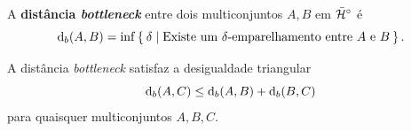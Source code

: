 \begin{defi}
    A \textbf{distância \textit{bottleneck}} entre dois multiconjuntos $A,B$ em $\bar{\mathcal{H}}^\circ$ é
    \begin{equation*}
        \text{d}_b(A,B) = \inf \Set{\delta | \text{Existe um } \delta \text{-emparelhamento entre 
        } A \text{ e } B}.
    \end{equation*}
\end{defi}

\begin{propo}
    A distância \textit{bottleneck} satisfaz a desigualdade triangular
    \begin{equation*}
        \text{d}_b(A,C) \leq \text{d}_b(A,B) + \text{d}_b(B,C)
    \end{equation*}
    para quaisquer multiconjuntos $A, B, C$. 
\end{propo}
